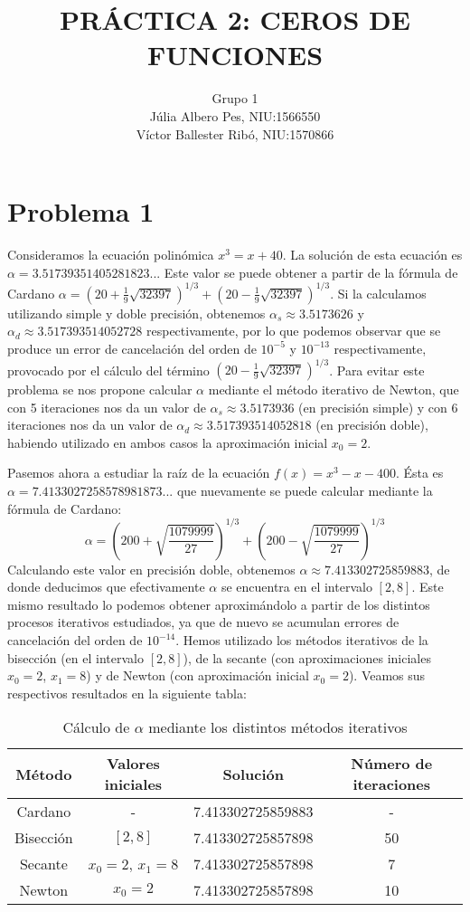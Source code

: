 \documentclass[a4paper]{article}
\title{\bfseries\Large PRÁCTICA 2: CEROS DE FUNCIONES}
\author{Grupo 1\\Júlia Albero Pes, NIU:1566550\\Víctor Ballester Ribó, NIU:1570866}
\date{\parbox{\linewidth}{\centering
  Métodos numéricos\endgraf
  Grado en Matemáticas\endgraf
  Universitat Autònoma de Barcelona\endgraf
  6 de Abril de 2021}}
\begin{document}
\maketitle
\thispagestyle{empty}
\newpage
\setcounter{page}{1}
\restoregeometry
\section*{Problema 1}
Consideramos la ecuación polinómica $x^3=x+40$. La solución de esta ecuación es $\alpha=3.51739351405281823$... Este valor se puede obtener a partir de la fórmula de Cardano $\alpha=\left(20+\frac{1}{9}\sqrt{32397}\right)^{1/3}+\left(20-\frac{1}{9}\sqrt{32397}\right)^{1/3}$. Si la calculamos utilizando simple y doble precisión, obtenemos $\alpha_s\approx3.5173626$ y $\alpha_d\approx3.517393514052728$ respectivamente, por lo que podemos observar que se produce un error de cancelación del orden de $10^{-5}$ y $10^{-13}$ respectivamente, provocado por el cálculo del término $(20-\frac{1}{9}\sqrt{32397})^{1/3}$. Para evitar este problema se nos propone calcular $\alpha$ mediante el método iterativo de Newton, que con 5 iteraciones nos da un valor de $\alpha_s\approx3.5173936$ (en precisión simple) y con 6 iteraciones nos da un valor de $\alpha_d\approx3.517393514052818$ (en precisión doble), habiendo utilizado en ambos casos la aproximación inicial $x_0=2$.\par
Pasemos ahora a estudiar la raíz de la ecuación $f(x)=x^3-x-400$. Ésta es $\alpha=7.4133027258578981873...$ que nuevamente se puede calcular mediante la fórmula de Cardano:
$$\alpha=\left(200+\sqrt{\frac{1079999}{27}}\right)^{1/3}+\left(200-\sqrt{\frac{1079999}{27}}\right)^{1/3}$$ Calculando este valor en precisión doble, obtenemos $\alpha\approx7.413302725859883$, de donde deducimos que efectivamente $\alpha$ se encuentra en el intervalo $[2,8]$. Este mismo resultado lo podemos obtener aproximándolo a partir de los distintos procesos iterativos estudiados, ya que de nuevo se acumulan errores de cancelación del orden de $10^{-14}$. Hemos utilizado los métodos iterativos de la bisección (en el intervalo $[2,8]$), de la secante (con aproximaciones iniciales $x_0=2$, $x_1=8$) y de Newton (con aproximación inicial $x_0=2$). Veamos sus respectivos resultados en la siguiente tabla:\par
\begin{table}[ht]
    \centering
    \begin{tabular}{|c|c|c|c|}
        \hline
         Método& Valores iniciales & Solución & Número de iteraciones  \\
         \hline
         Cardano & - &7.413302725859883& -\\
         \hline
         Bisección & $[2,8]$ & 7.413302725857898& 50\\
         \hline
         Secante & $x_0=2$, $x_1=8$ &7.413302725857898& 7\\
         \hline
         Newton & $x_0=2$ &7.413302725857898& 10\\
         \hline
    \end{tabular}
    \caption{Cálculo de $\alpha$ mediante los distintos métodos iterativos}
    \label{pro1-tab1}
\end{table}
\end{document}
